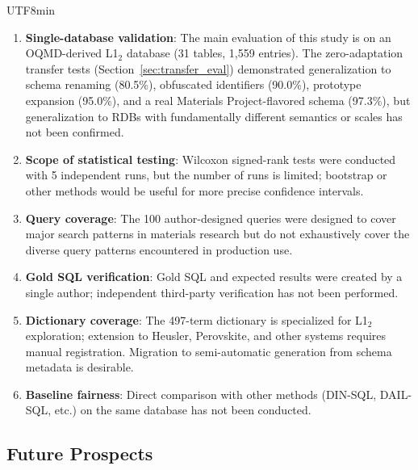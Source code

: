 \documentclass[sn-mathphys,Numbered]{sn-jnl}
\begin{document}
\begin{CJK}{UTF8}{min}
\begin{enumerate}
  \item \textbf{Single-database validation}:
    The main evaluation of this study is on an OQMD-derived L1$_2$
    database (31 tables, 1{,}559 entries).
    The zero-adaptation transfer tests
    (Section~\ref{sec:transfer_eval}) demonstrated generalization
    to schema renaming (80.5\%), obfuscated identifiers (90.0\%),
    prototype expansion (95.0\%), and a real Materials
    Project-flavored schema (97.3\%), but generalization to RDBs
    with fundamentally different semantics or scales has not been
    confirmed.
  \item \textbf{Scope of statistical testing}:
    Wilcoxon signed-rank tests were conducted with 5 independent
    runs, but the number of runs is limited; bootstrap or other
    methods would be useful for more precise confidence intervals.
  \item \textbf{Query coverage}:
    The 100 author-designed queries were designed to cover major
    search patterns in materials research but do not exhaustively
    cover the diverse query patterns encountered in production use.
  \item \textbf{Gold SQL verification}:
    Gold SQL and expected results were created by a single author;
    independent third-party verification has not been performed.
  \item \textbf{Dictionary coverage}:
    The 497-term dictionary is specialized for L1$_2$ exploration;
    extension to Heusler, Perovskite, and other systems requires
    manual registration.
    Migration to semi-automatic generation from schema metadata
    is desirable.
  \item \textbf{Baseline fairness}:
    Direct comparison with other methods (DIN-SQL, DAIL-SQL, etc.)
    on the same database has not been conducted.
\end{enumerate}

\subsection{Future Prospects}


\end{CJK}
\end{document}
